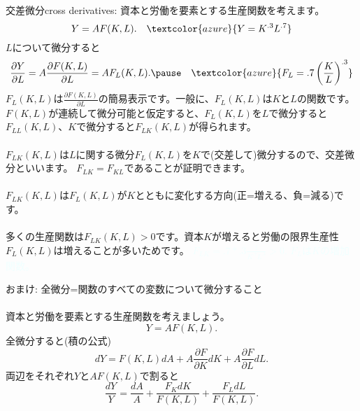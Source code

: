 \begin{frame}[t]{}
交差微分cross derivatives: 資本と労働を要素とする生産関数を考えます。
\[
Y=AF(K, L). \quad \textcolor{azure}{\footnotesize Y=K^{.3}L^{.7}}
\]
\pause
$L$について微分すると
\[
\frac{\partial Y}{\partial L}=A\frac{\partial F(K, L)}{\partial L}=AF_{L}(K, L). \pause
\quad \textcolor{azure}{\footnotesize F_{L}=.7\left(\frac{K}{L}\right)^{.3}}
\]
\pause
$F_{L}(K, L)$は$\frac{\partial F(K, L)}{\partial L}$の簡易表示です。一般に、$F_{L}(K, L)$は$K$と$L$の関数です。$F(K, L)$が連続して微分可能と仮定すると、$F_{L}(K, L)$を$L$で微分すると$F_{LL}(K, L)$、$K$で微分すると$F_{LK}(K, L)$が得られます。\\~\\
\pause
$F_{LK}(K, L)$は$L$に関する微分$F_{L}(K, L)$を$K$で(交差して)微分するので、交差微分といいます。\pause
$F_{LK}=F_{KL}$であることが証明できます。\\~\\
\pause
$F_{LK}(K, L)$は$F_{L}(K, L)$が$K$とともに変化する方向(正=増える、負=減る)です。\\~\\
\pause
多くの生産関数は$F_{LK}(K, L)>0$です。資本$K$が増えると労働の限界生産性$F_{L}(K, L)$は増えることが多いためです。\pause
\textcolor{azure}{\footnotesize $F_{LK}=.7*.3\frac{1}{K^{.7}L^{.3}}>0.$ $F_{L}$は$K$の増加関数。}
\end{frame}

\begin{frame}[t]{}
おまけ: 全微分=関数のすべての変数について微分すること\\~\\
資本と労働を要素とする生産関数を考えましょう。
\[
Y=AF(K, L).
\]
全微分すると(積の公式)
\[
dY=F(K, L)dA+A\frac{\partial F}{\partial K}dK+A\frac{\partial F}{\partial L}dL.
\]
両辺をそれぞれ$Y$と$AF(K, L)$で割ると
\[
\frac{dY}{Y}=\frac{dA}{A}+\frac{F_{K}dK}{F(K, L)}+\frac{F_{L}dL}{F(K, L)}.
\]
\end{frame}

